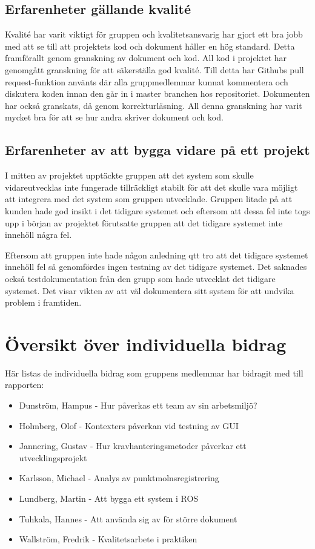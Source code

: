 \subsection{Erfarenheter gällande kvalité}

Kvalité har varit viktigt för gruppen och kvalitetsansvarig har gjort ett bra jobb med att se till att projektets kod och dokument håller en hög standard. Detta framförallt genom granskning av dokument och kod. All kod i projektet har genomgått granskning för att säkerställa god kvalité. Till detta har Githubs pull request-funktion använts där alla gruppmedlemmar kunnat kommentera och diskutera koden innan den går in i master branchen hos repositoriet. Dokumenten har också granskats, då genom korrekturläsning. All denna granskning har varit mycket bra för att se hur andra skriver dokument och kod.

\subsection{Erfarenheter av att bygga vidare på ett projekt}

I mitten av projektet upptäckte gruppen att det system som skulle vidareutvecklas inte fungerade tillräckligt stabilt för att det skulle vara möjligt att integrera med det system som gruppen utvecklade. Gruppen litade på att kunden hade god insikt i det tidigare systemet och eftersom att dessa fel inte togs upp i början av projektet förutsatte gruppen att det tidigare systemet inte innehöll några fel.

Eftersom att gruppen inte hade någon anledning qtt tro att det tidigare systemet innehöll fel så genomfördes ingen testning av det tidigare systemet. Det saknades också testdokumentation från den grupp som hade utvecklat det tidigare systemet. Det visar vikten av att väl dokumentera sitt system för att undvika problem i framtiden.


\section{Översikt över individuella bidrag}

Här listas de individuella bidrag som gruppens medlemmar har bidragit med till rapporten:

\begin{itemize}
	\item Dunström, Hampus - Hur påverkas ett team av sin arbetsmiljö?
	\item Holmberg, Olof - Kontexters påverkan vid testning av GUI
	\item Jannering, Gustav - Hur kravhanteringsmetoder påverkar ett utvecklingsprojekt
	\item Karlsson, Michael - Analys av punktmolnsregistrering
	\item Lundberg, Martin - Att bygga ett system i ROS
	\item Tuhkala, Hannes - Att använda sig av \latex för större dokument
	\item Wallström, Fredrik - Kvalitetsarbete i praktiken
\end{itemize}



